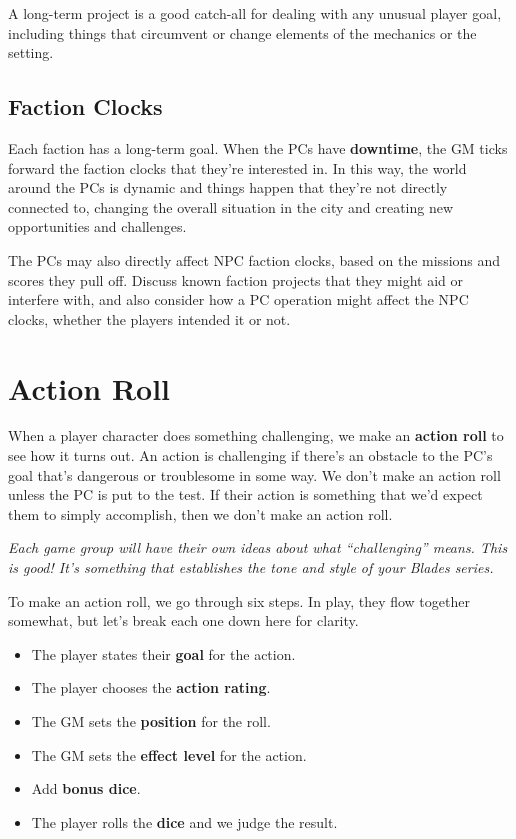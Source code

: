 \documentclass[11pt,fleqn,a5paper]{book}
\begin{document}
A long-term project is a good catch-all for dealing with any unusual player goal, including things that circumvent or change elements of the mechanics or the setting.

\section{Faction Clocks}

Each faction has a long-term goal. When the PCs have \textbf{downtime}, the GM ticks forward the faction clocks that they’re interested in. In this way, the world around the PCs is dynamic and things happen that they’re not directly connected to, changing the overall situation in the city and creating new opportunities and challenges.

The PCs may also directly affect NPC faction clocks, based on the missions and scores they pull off. Discuss known faction projects that they might aid or interfere with, and also consider how a PC operation might affect the NPC clocks, whether the players intended it or not.

\chapter{Action Roll}

When a player character does something challenging, we make an \textbf{action roll} to see how it turns out. An action is challenging if there’s an obstacle to the PC’s goal that’s dangerous or troublesome in some way. We don’t make an action roll unless the PC is put to the test. If their action is something that we’d expect them to simply accomplish, then we don’t make an action roll.

\emph{Each game group will have their own ideas about what “challenging” means. This is good! It’s something that establishes the tone and style of your Blades series.}

To make an action roll, we go through six steps. In play, they flow together somewhat, but let’s break each one down here for clarity.

\begin{itemize}
	\item The player states their \textbf{goal} for the action.
	\item The player chooses the \textbf{action rating}.
	\item The GM sets the \textbf{position} for the roll.
	\item The GM sets the \textbf{effect level} for the action.
	\item Add \textbf{bonus dice}.
	\item The player rolls the \textbf{dice} and we judge the result.
\end{itemize}
\end{document}
